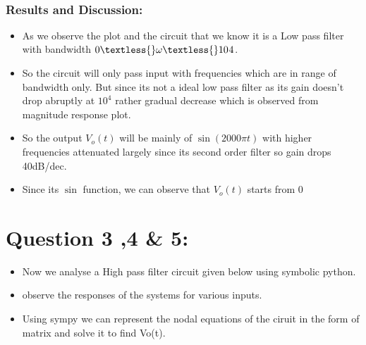 \documentclass[10pt,a4paper]{article}
\providecommand{\tightlist}{%
      \setlength{\itemsep}{0pt}\setlength{\parskip}{0pt}}
\begin{document}
    \begin{center}
    \end{center}
    { \hspace*{\fill} \\}
    
    \subsubsection{Results and Discussion:}\label{results-and-discussion}

\begin{itemize}
\tightlist
\item
  As we observe the plot and the circuit that we know it is a Low pass
  filter with bandwidth $0\textless{} \omega \textless{} 10^{}4$.
\item
  So the circuit will only pass input with frequencies which are in
  range of bandwidth only. But since its not a ideal low pass filter as
  its gain doesn't drop abruptly at \(10^4\) rather gradual decrease
  which is observed from magnitude response plot.
\item
  So the output \(V_o(t)\) will be mainly of \(\sin(2000\pi t)\) with
  higher frequencies attenuated largely since its second order filter so
  gain drops 40dB/dec.
\item
  Since its \(\sin\) function, we can observe that \(V_{o}(t)\) starts
  from 0
\end{itemize}

    \section{Question 3 ,4 \& 5:}\label{question-3-4-5}

\begin{itemize}
\tightlist
\item
  Now we analyse a High pass filter circuit given below using symbolic
  python.
\item
  observe the responses of the systems for various inputs.
\end{itemize}

\begin{itemize}
\tightlist
\item
  Using sympy we can represent the nodal equations of the ciruit in the
  form of matrix and solve it to find Vo(t).
\end{itemize}
\end{document}
